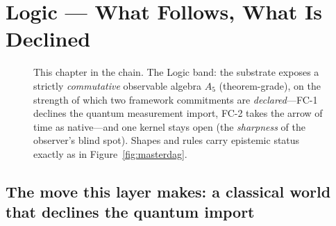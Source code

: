 \chapter{Logic --- What Follows, What Is Declined}\label{ch:logic}


\begin{figure}[t]
  \centering
  \caption[This chapter in the chain]{This chapter in the chain. The Logic band:
    the substrate exposes a strictly \emph{commutative} observable algebra $A_5$
    (theorem-grade), on the strength of which two framework commitments are
    \emph{declared}---FC-1 declines the quantum measurement import, FC-2 takes the
    arrow of time as native---and one kernel stays open (the \emph{sharpness} of
    the observer's blind spot). Shapes and rules carry epistemic status exactly
    as in Figure~\ref{fig:masterdag}.}
  \label{fig:minimap-logic}
\end{figure}

\section*{The move this layer makes: a classical world that declines the quantum import}

